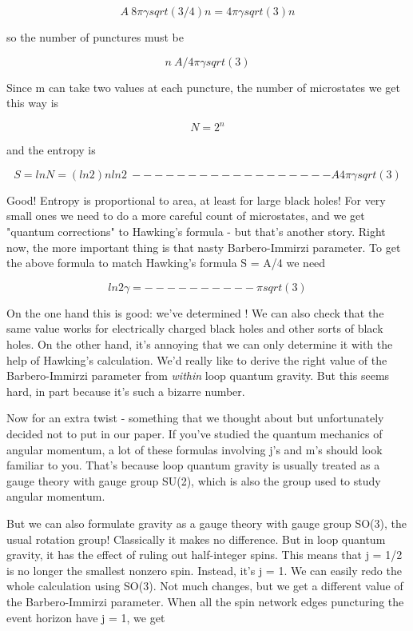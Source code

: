 $$

A ~ 8 \pi  \gamma  sqrt(3/4) n 

  = 4 \pi  \gamma  sqrt(3) n
$$
    
so the number of punctures must be


$$

n ~ A / 4 \pi  \gamma  sqrt(3)
$$
    
Since m can take two values at each puncture, the number of microstates
we get this way is


$$

N = 2^{n}
$$
    
and the entropy is


$$

S = ln N

  = (ln 2) n


           ln 2 
  ~ ------------------ A
    4 \pi  \gamma  sqrt(3)  
$$
    
Good!  Entropy is proportional to area, at least for large black holes!
For very small ones we need to do a more careful count of microstates,
and we get "quantum corrections" to Hawking's formula - but that's
another story.  Right now, the more important thing is that nasty
Barbero-Immirzi parameter.  To get the above formula to match Hawking's
formula S = A/4 we need


$$

           ln 2
\gamma  = ----------
        \pi  sqrt(3)

$$
    
On the one hand this is good: we've determined \gamma !  We can also check
that the same value works for electrically charged black holes and
other sorts of black holes.  On the other hand, it's annoying that we
can only determine it with the help of Hawking's calculation.  We'd
really like to derive the right value of the Barbero-Immirzi parameter
from \emph{within} loop quantum gravity.  But this seems hard, in part
because it's such a bizarre number.

Now for an extra twist - something that we thought about but
unfortunately decided not to put in our paper.  If you've studied the
quantum mechanics of angular momentum, a lot of these formulas involving
j's and m's should look familiar to you.  That's because loop quantum
gravity is usually treated as a gauge theory with gauge group SU(2),
which is also the group used to study angular momentum.

But we can also formulate gravity as a gauge theory with gauge group
SO(3), the usual rotation group!  Classically it makes no difference.
But in loop quantum gravity, it has the effect of ruling out
half-integer spins.  This means that j = 1/2 is no longer the smallest
nonzero spin.  Instead, it's j = 1.  We can easily redo the whole
calculation using SO(3).  Not much changes, but we get a different value
of the Barbero-Immirzi parameter.  When all the spin network edges
puncturing the event horizon have j = 1, we get


